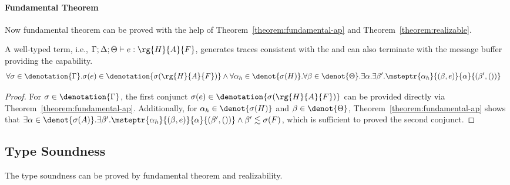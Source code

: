 \paragraph{Fundamental Theorem} Now fundamental theorem can be proved with the help of Theorem~\ref{theorem:fundamental-ap} and Theorem~\ref{theorem:realizable}.

\begin{theorem}\label{theorem:fundamental-original}A well-typed term, i.e., \(\Gamma; \Delta; \Theta \vdash e : \rg{H}{A}{F}\), generates traces consistent with the \PAT and can also terminate with the message buffer providing the capability.
{\small\begin{align*}
   &\forall \sigma \in
    \denotation{\Gamma}. \sigma(e) \in
    \denotation{\sigma(\rg{H}{A}{F})} \land  \forall \alpha_h \in \denot{\sigma(H)}.\forall \beta \in \denot{\Theta}. \exists \alpha.\exists \beta'. \msteptr{\alpha_h}{(\beta, e)}{\alpha}{(\beta', ())}
\end{align*}}
\end{theorem}
\begin{proof} For $\sigma \in\denotation{\Gamma}$, the first conjunct $\sigma(e) \in
    \denotation{\sigma(\rg{H}{A}{F})}$ can be provided directly via Theorem~\ref{theorem:fundamental-ap}. Additionally, for $ \alpha_h \in \denot{\sigma(H)}$ and  $\beta \in \denot{\Theta}$, Theorem~\ref{theorem:fundamental-ap} shows that $\exists \alpha \in \denot{\sigma(A)}.\exists \beta'. \msteptr{\alpha_h}{(\beta, e)}{\alpha}{(\beta', ())} \land \beta' \realz \sigma(F)$, which is sufficient to proved the second conjunct.
\end{proof}

\subsection{Type Soundness}

The type soundness can be proved by fundamental theorem and realizability.

